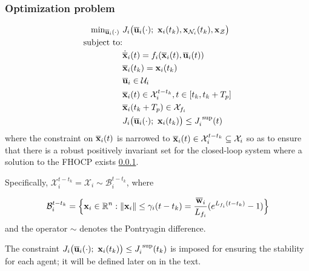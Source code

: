 \subsubsection{Optimization problem}

\begin{align}
  \text{min}_{\overline{\bm{\mathbf{u}}}_i (\cdot)}\ &
    J_i \big(\overline{\bm{\mathbf{u}}}_i (\cdot);\ \bm{\mathbf{x}}_i(t_k), \bm{\mathbf{x}}_{\mathcal{N}_i}(t_k), \bm{\mathbf{x}}_{\mathcal{Z}}\big) \\
  \text{subject to:} & \\
  & \dot{\overline{\bm{\mathbf{x}}}}_i(t) = f_i (\overline{\bm{\mathbf{x}}}_i (t), \overline{\bm{\mathbf{u}}}_i (t)) \\
  & \overline{\bm{\mathbf{x}}}_i (t_k) = \bm{\mathbf{x}}_i (t_k) \\
  & \overline{\bm{\mathbf{u}}}_i \in \mathcal{U}_i \\
  & \overline{\bm{\mathbf{x}}}_i (t) \in \mathcal{X}_i^{t - t_k}, t \in [t_k, t_k + T_p] \\
  & \overline{\bm{\mathbf{x}}}_i (t_k + T_p) \in \mathcal{X}_{f_i} \\
  & J_i \big(\overline{\bm{\mathbf{u}}}_i (\cdot);\ \bm{\mathbf{x}}_i(t_k)\big) \leq J_i^{\text{ sup}}(t)
\end{align}
where the constraint on $\overline{\bm{\mathbf{x}}}_i (t)$ is narrowed to
$\overline{\bm{\mathbf{x}}}_i (t) \in \mathcal{X}_i^{t - t_k} \subseteq \mathcal{X}_i$
so as to ensure that there is a robust positively invariant set for the
closed-loop system where a solution to the FHOCP exists \ref{}.


Specifically,
$\mathcal{X}_i^{t - t_k} = \mathcal{X}_i \sim \mathcal{B}_i^{t-t_k}$, where

\begin{align}
  \mathcal{B}_i^{t-t_k} =
  \Big\{\bm{\mathbf{x}}_i \in \mathbb{R}^n : \|\bm{\mathbf{x}}_i\| \leq \gamma_i (t-t_k) = \frac{\overline{\bm{\mathbf{w}}}_i}{L_{f_i}} (e^{L_{f_i} (t-t_k)} - 1) \Big\}
\end{align}
and the operator $\sim$ denotes the Pontryagin difference.

The constraint $J_i \big(\overline{\bm{\mathbf{u}}}_i (\cdot);\ \bm{\mathbf{x}}_i(t_k)\big) \leq J_i^{\text{ sup}}(t_k)$
is imposed for ensuring the stability for each agent; it will be defined later
on in the text.

